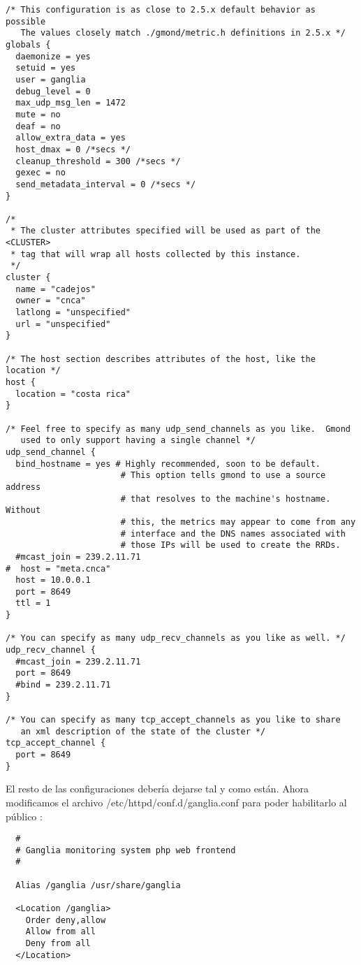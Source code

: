 \begin{lstlisting}
/* This configuration is as close to 2.5.x default behavior as possible
   The values closely match ./gmond/metric.h definitions in 2.5.x */
globals {
  daemonize = yes
  setuid = yes
  user = ganglia
  debug_level = 0
  max_udp_msg_len = 1472
  mute = no
  deaf = no
  allow_extra_data = yes
  host_dmax = 0 /*secs */
  cleanup_threshold = 300 /*secs */
  gexec = no
  send_metadata_interval = 0 /*secs */
}

/*
 * The cluster attributes specified will be used as part of the <CLUSTER>
 * tag that will wrap all hosts collected by this instance.
 */
cluster {
  name = "cadejos"
  owner = "cnca"
  latlong = "unspecified"
  url = "unspecified"
}

/* The host section describes attributes of the host, like the location */
host {
  location = "costa rica"
}

/* Feel free to specify as many udp_send_channels as you like.  Gmond
   used to only support having a single channel */
udp_send_channel {
  bind_hostname = yes # Highly recommended, soon to be default.
                       # This option tells gmond to use a source address
                       # that resolves to the machine's hostname.  Without
                       # this, the metrics may appear to come from any
                       # interface and the DNS names associated with
                       # those IPs will be used to create the RRDs.
  #mcast_join = 239.2.11.71
#  host = "meta.cnca"
  host = 10.0.0.1
  port = 8649
  ttl = 1
}

/* You can specify as many udp_recv_channels as you like as well. */
udp_recv_channel {
  #mcast_join = 239.2.11.71
  port = 8649
  #bind = 239.2.11.71
}

/* You can specify as many tcp_accept_channels as you like to share
   an xml description of the state of the cluster */
tcp_accept_channel {
  port = 8649
}
\end{lstlisting}

El resto de las configuraciones debería dejarse tal y como están. Ahora modificamos el  archivo /etc/httpd/conf.d/ganglia.conf para poder habilitarlo al público \cite{webganglia}:

\begin{lstlisting}
  #
  # Ganglia monitoring system php web frontend
  #

  Alias /ganglia /usr/share/ganglia

  <Location /ganglia>
    Order deny,allow
    Allow from all
    Deny from all
  </Location>
\end{lstlisting}

